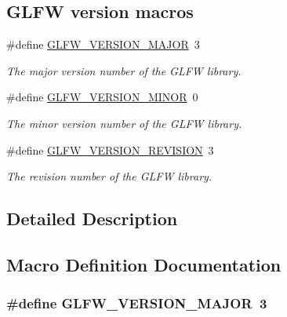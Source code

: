\subsection*{G\-L\-F\-W version macros}
\begin{DoxyCompactItemize}
\item 
\#define \hyperlink{group__init_ga6337d9ea43b22fc529b2bba066b4a576}{G\-L\-F\-W\-\_\-\-V\-E\-R\-S\-I\-O\-N\-\_\-\-M\-A\-J\-O\-R}~3
\begin{DoxyCompactList}\small\item\em The major version number of the G\-L\-F\-W library. \end{DoxyCompactList}\item 
\#define \hyperlink{group__init_gaf80d40f0aea7088ff337606e9c48f7a3}{G\-L\-F\-W\-\_\-\-V\-E\-R\-S\-I\-O\-N\-\_\-\-M\-I\-N\-O\-R}~0
\begin{DoxyCompactList}\small\item\em The minor version number of the G\-L\-F\-W library. \end{DoxyCompactList}\item 
\#define \hyperlink{group__init_gab72ae2e2035d9ea461abc3495eac0502}{G\-L\-F\-W\-\_\-\-V\-E\-R\-S\-I\-O\-N\-\_\-\-R\-E\-V\-I\-S\-I\-O\-N}~3
\begin{DoxyCompactList}\small\item\em The revision number of the G\-L\-F\-W library. \end{DoxyCompactList}\end{DoxyCompactItemize}


\subsection{Detailed Description}


\subsection{Macro Definition Documentation}
\hypertarget{group__init_ga6337d9ea43b22fc529b2bba066b4a576}{
\subsubsection[{G\-L\-F\-W\-\_\-\-V\-E\-R\-S\-I\-O\-N\-\_\-\-M\-A\-J\-O\-R}]{\setlength{\rightskip}{0pt plus 5cm}\#define G\-L\-F\-W\-\_\-\-V\-E\-R\-S\-I\-O\-N\-\_\-\-M\-A\-J\-O\-R~3}}\label{group__init_ga6337d9ea43b22fc529b2bba066b4a576}


